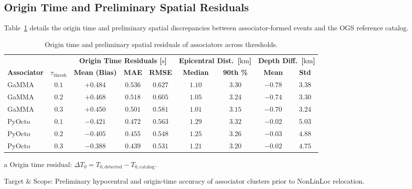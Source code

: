 \subsection{Origin Time and Preliminary Spatial Residuals}
\label{subsec:associator_residuals}

Table~\ref{tab:associator_residuals} details the origin time and preliminary spatial discrepancies between associator-formed events and the OGS reference catalog.

\begin{table}[htbp]
  \centering
  \small
  \caption{Origin time and preliminary spatial residuals of associators across thresholds.}
  \label{tab:associator_residuals}
  \begin{threeparttable}
    \begin{tabularx}{\linewidth}{l c c c c c c c c}
      \toprule
      & & \multicolumn{3}{c}{\textbf{Origin Time Residuals [$\unit{\second}$]}\tnote{a}} & \multicolumn{2}{c}{\textbf{Epicentral Dist.\ [$\unit{\kilo\meter}$]}} & \multicolumn{2}{c}{\textbf{Depth Diff.\ [$\unit{\kilo\meter}$]}} \\
      \cmidrule(lr){3-5} \cmidrule(lr){6-7} \cmidrule(lr){8-9}
      \textbf{Associator} & $\tau_{\mathrm{thresh}}$ & \textbf{Mean (Bias)} & \textbf{MAE} & \textbf{RMSE} & \textbf{Median} & \textbf{90th \%} & \textbf{Mean} & \textbf{Std} \\
      \midrule
      GaMMA & $0.1$ & $+0.484$ & $0.536$ & $0.627$ & $\mathbf{1.10}$ & $3.30$ & $-0.78$ & $\mathbf{3.38}$ \\
      GaMMA & $0.2$ & $+0.468$ & $0.518$ & $0.605$ & $1.05$ & $3.24$ & $-0.74$ & $3.30$ \\
      GaMMA & $0.3$ & $+0.450$ & $0.501$ & $0.581$ & $1.01$ & $3.15$ & $-0.70$ & $3.24$ \\
      \midrule
      PyOcto & $0.1$ & $-0.421$ & $0.472$ & $0.563$ & $1.29$ & $3.32$ & $\mathbf{-0.02}$ & $5.03$ \\
      PyOcto & $0.2$ & $-0.405$ & $0.455$ & $0.548$ & $1.25$ & $3.26$ & $-0.03$ & $4.88$ \\
      PyOcto & $0.3$ & $-0.388$ & $0.439$ & $0.531$ & $1.21$ & $3.20$ & $-0.02$ & $4.75$ \\
      \bottomrule
    \end{tabularx}
    \begin{tablenotes}[flushleft]
      \footnotesize
      \item[a] Origin time residual: $\Delta T_0 = T_{0, \mathrm{detected}} - T_{0, \mathrm{catalog}}$.
      \item Target \& Scope: Preliminary hypocentral and origin-time accuracy of associator clusters prior to NonLinLoc relocation.

\end{tablenotes}
\end{threeparttable}
\end{table}

